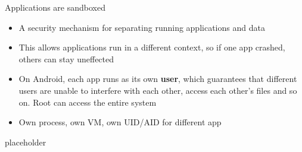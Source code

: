 \documentclass{article}
\begin{document}
Applications are sandboxed
\begin{itemize}
 \item A security mechanism for separating running applications and data
 \item This allows applications run in a different context, so if one app crashed, others can stay uneffected
 \item On Android, each app runs as its own \textbf{user}, which guarantees that different users are unable to interfere with each other, access each other’s files and so on. Root can access the entire system
 \item Own process, own VM, own UID/AID for different app
\end{itemize}

\newpage

\begin{description}
	\item[placeholder] \hfill \\
\end{description}
\end{document}
